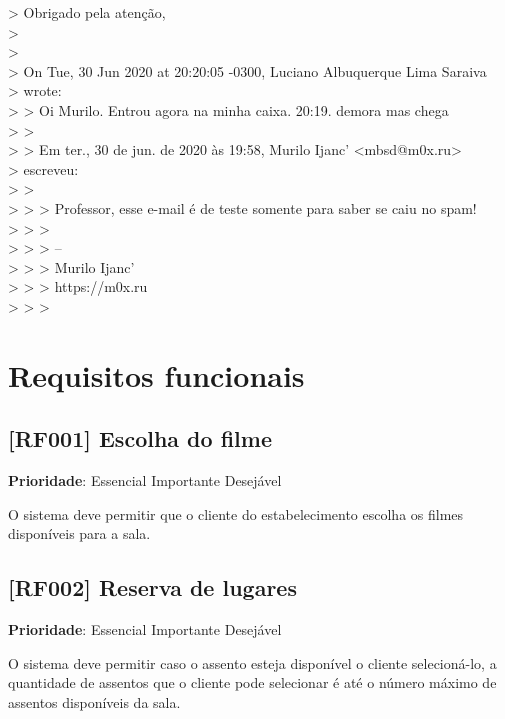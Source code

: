 \documentclass[12pt,a4paper]{article}
\let\oldsection\section
\renewcommand\section{\clearpage\oldsection}
\begin{document}
> Obrigado pela atenção,\\
>\\
>\\
> On Tue, 30 Jun 2020 at 20:20:05 -0300, Luciano Albuquerque Lima Saraiva\\
> wrote:\\
> > Oi Murilo. Entrou agora na minha caixa. 20:19. demora mas chega\\
> >\\
> > Em ter., 30 de jun. de 2020 às 19:58, Murilo Ijanc' <mbsd@m0x.ru>\\
> escreveu:\\
> >\\
> > > Professor, esse e-mail é de teste somente para saber se caiu no spam!\\
> > >\\
> > > --\\
> > > Murilo Ijanc'\\
> > > https://m0x.ru\\
> > >\\



\section{Requisitos funcionais}
\subsection{[RF001] Escolha do filme}

\textbf{Prioridade}:
\mbox{\ooalign{$\checkmark$\cr\hidewidth$\square$\hidewidth\cr}} Essencial
\mbox{\ooalign{\cr\hidewidth$\square$\hidewidth\cr}} Importante
\mbox{\ooalign{\cr\hidewidth$\square$\hidewidth\cr}} Desejável

O sistema deve permitir que o cliente do estabelecimento escolha os filmes disponíveis
para a sala.

\subsection{[RF002] Reserva de lugares}

\textbf{Prioridade}:
\mbox{\ooalign{$\checkmark$\cr\hidewidth$\square$\hidewidth\cr}} Essencial
\mbox{\ooalign{\cr\hidewidth$\square$\hidewidth\cr}} Importante
\mbox{\ooalign{\cr\hidewidth$\square$\hidewidth\cr}} Desejável

O sistema deve permitir caso o assento esteja disponível o cliente selecioná-lo,
a quantidade de assentos que o cliente pode selecionar é até o número máximo de
assentos disponíveis da sala.
\end{document}
